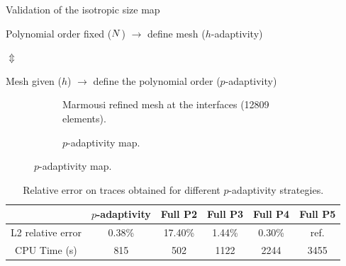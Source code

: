 \begin{frame}[noframenumbering]{Validation of the isotropic size map}
  \begin{block}{}
    Polynomial order fixed (${N}$) $\longrightarrow$ define mesh ($h$-adaptivity)
  \end{block}

  $\Updownarrow$

    \begin{block}{}
    Mesh given ($h$) $\longrightarrow$ define the polynomial order ($p$-adaptivity)
    \end{block}

      \vspace{-0.4cm}
\setlength{\modelwidth}{6.5cm}
\begin{figure}[!htbp]
  \renewcommand{\modelfile}{image/iso22_mesh}
     \begin{subfigure}[!htbp]{0.5\textwidth}
        \vspace{0.4cm}
        \hspace{-0.5cm}
         \centering
         
         \caption{Marmousi refined mesh at the interfaces (12809 elements).}
         \label{marmousi_mesh_padapt}
     \end{subfigure}
     \hspace{-1cm}
     \renewcommand{\modelfile}{image/iso22_order}
     \renewcommand{\cmapmin}{2}
     \renewcommand{\cmapmax}{4}
     \begin{subfigure}[!htbp]{0.5\textwidth}
        \vspace{-0.3cm}
         \centering
         
         \vspace{-0.9cm}
         \caption{$p$-adaptivity map.}
         \label{marmousi_order_padapt}
     \end{subfigure}

\end{figure}

\vspace{-1cm}
\begin{table}[!htbp]
  \small
    \centering
    \begin{tabular}{|c|c|c|c|c|c|}
    \hline
         & $p$-adaptivity & Full P2 & Full P3 & Full P4 & Full P5 \\ \hline
        L2 relative error & 0.38\%  & 17.40\% & 1.44\% & 0.30\% &  ref. \\ \hline
        CPU Time (s) & 815 & 502 & 1122 & 2244 & 3455 \\ \hline
    \end{tabular}
    \caption{Relative error on traces obtained for different $p$-adaptivity strategies.}
    \label{marmousi_padapt_test_error}
\end{table}
\end{frame}
